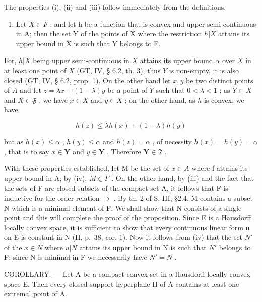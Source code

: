 The properties (i), (ii) and (iii) follow immediately from the definitions.

\begin{enumerate}
\def\labelenumi{(\roman{enumi})}
\setcounter{enumi}{3}
\tightlist
\item
  Let \(X \in F\) , and let h be a function that is convex and upper semi-continuous in A; then the set Y of the points of X where the restriction \(h|X\) attains its upper bound in X is such that Y belongs to F.
\end{enumerate}

For, \(h|X\) being upper semi-continuous in \(X\) attains its upper bound \(\alpha\) over \(X\) in at least one point of \(X\) (GT, IV, § 6.2, th. 3); thus \(Y\) is non-empty, it is also closed (GT, IV, § 6.2, prop. 1). On the other hand let \(x, y\) be two distinct points of \(A\) and let \(z = \lambda x + (1 - \lambda)y\) be a point of \(Y\) such that \(0 < \lambda < 1\) ; as \(Y \subset X\) and \(X \in \mathfrak{F}\) , we have \(x \in X\) and \(y \in X\) ; on the other hand, as \(h\) is convex, we have

\[
h (z) \leqslant \lambda h (x) + (1 - \lambda) h (y)
\]

but as \(h(x) \leqslant \alpha\) , \(h(y) \leqslant \alpha\) and \(h(z) = \alpha\) , of necessity \(h(x) = h(y) = \alpha\) , that is to say \(x \in \mathbf{Y}\) and \(y \in \mathbf{Y}\) . Therefore \(\mathbf{Y} \in \mathfrak{F}\) .

With these properties established, let M be the set of \(x \in A\) where f attains its upper bound in A; by (iv), \(M \in F\) . On the other hand, by (iii) and the fact that the sets of F are closed subsets of the compact set A, it follows that F is inductive for the order relation \(\supset\) . By th. 2 of S, III, §2.4, M contains a subset N which is a minimal element of F. We shall show that N consists of a single point and this will complete the proof of the proposition. Since E is a Hausdorff locally convex space, it is sufficient to show that every continuous linear form u on E is constant in N (II, p.~38, cor. 1). Now it follows from (iv) that the set \(N'\) of the \(x \in N\) where \(u|N\) attains its upper bound in N is such that \(N'\) belongs to F; since N is minimal in F we necessarily have \(N' = N\) .

COROLLARY. --- Let A be a compact convex set in a Hausdorff locally convex space E. Then every closed support hyperplane H of A contains at least one extremal point of A.

